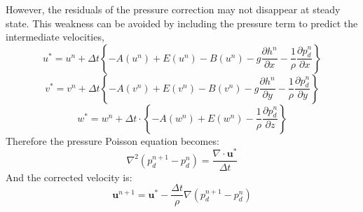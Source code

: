 However, the residuals of the pressure correction may not
disappear at steady state. This weakness can be avoided by
including the pressure term to predict the intermediate velocities,
\begin {equation}
u^{*} = u^{n}+ \Delta t  \left\{
-A(u^n)+E(u^n)-B(u^n)-g\frac{\partial h^n}{\partial
x}-\frac{1}{\rho}\frac{\partial p_d^n}{\partial x} \right\}
\label{eqn:chap-FlowModel-momentum-u}
\end{equation}
\begin {equation}
v^{*} = v^{n}+ \Delta t  \left\{
-A(v^n)+E(v^n)-B(v^n)-g\frac{\partial h^n}{\partial
y}-\frac{1}{\rho}\frac{\partial p_d^n}{\partial y} \right\}
\label{eqn:chap-FlowModel-momentum-v}
\end{equation}
\begin {equation}
w^{*} = w^{n}+ \Delta t \cdot \left\{
-A(w^n)+E(w^n)-\frac{1}{\rho}\frac{\partial p_d^n}{\partial z}
\right\}
\label{eqn:chap-FlowModel-momentum-w}
\end{equation}
Therefore the pressure Poisson equation becomes:
\begin{equation}
\nabla^2 (p_d^{n+1}-p_d^{n}) = \frac{\nabla \cdot
\textbf{u}^*}{\Delta t}
\end{equation}
And the corrected velocity is:
\begin{equation}
\textbf{u}^{n+1}=\textbf{u}^*- \frac{\Delta t}{\rho}
\nabla (p_d^{n+1}-p_d^n)
\end{equation}



